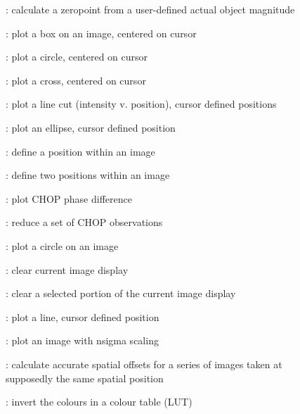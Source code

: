 \begin{description}
\begin{description}
\item []: calculate a zeropoint from a
user-defined actual object magnitude

\item []: plot a box on an image, centered on cursor

\item []: plot a circle, centered on cursor

\item []: plot a cross, centered on cursor

\item []: plot a line cut (intensity v. position),
cursor defined positions

\item []: plot an ellipse, cursor defined position

\item []: define a position within an image

\item []: define two positions within an image

\item []: plot CHOP phase difference

\item []: reduce a set of CHOP observations

\item []: plot a circle on an image

\item []: clear current image display

\item []: clear a selected portion of the
current image display

\item []: plot a line, cursor defined position

\item []: plot an image with nsigma scaling

\item []: calculate accurate spatial offsets for a
series of images taken at supposedly the same spatial position

\item []:  invert the colours in a colour table (LUT)


\end{description}
\end{description}
